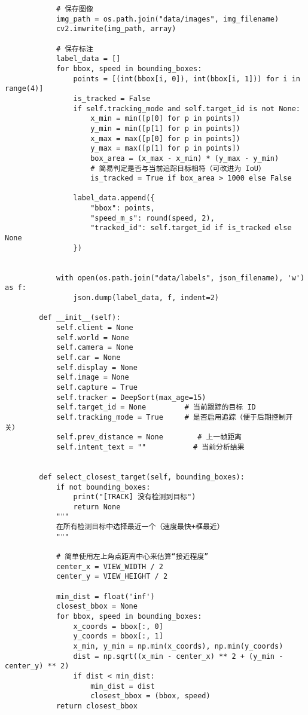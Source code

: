 \begin{lstlisting}
	        # 保存图像
	        img_path = os.path.join("data/images", img_filename)
	        cv2.imwrite(img_path, array)
	
	        # 保存标注
	        label_data = []
	        for bbox, speed in bounding_boxes:
	            points = [(int(bbox[i, 0]), int(bbox[i, 1])) for i in range(4)]
	            is_tracked = False
	            if self.tracking_mode and self.target_id is not None:
	                x_min = min([p[0] for p in points])
	                y_min = min([p[1] for p in points])
	                x_max = max([p[0] for p in points])
	                y_max = max([p[1] for p in points])
	                box_area = (x_max - x_min) * (y_max - y_min)
	                # 简易判定是否与当前追踪目标相符（可改进为 IoU）
	                is_tracked = True if box_area > 1000 else False
	
	            label_data.append({
	                "bbox": points,
	                "speed_m_s": round(speed, 2),
	                "tracked_id": self.target_id if is_tracked else None
	            })
	
	
	        with open(os.path.join("data/labels", json_filename), 'w') as f:
	            json.dump(label_data, f, indent=2)
	
	    def __init__(self):
	        self.client = None
	        self.world = None
	        self.camera = None
	        self.car = None
	        self.display = None
	        self.image = None
	        self.capture = True
	        self.tracker = DeepSort(max_age=15)
	        self.target_id = None         # 当前跟踪的目标 ID
	        self.tracking_mode = True     # 是否启用追踪（便于后期控制开关）
	        self.prev_distance = None        # 上一帧距离
	        self.intent_text = ""           # 当前分析结果
	
	
	    def select_closest_target(self, bounding_boxes):
	        if not bounding_boxes:
	            print("[TRACK] 没有检测到目标")
	            return None
	        """
	        在所有检测目标中选择最近一个（速度最快+框最近）
	        """
	
	        # 简单使用左上角点距离中心来估算“接近程度”
	        center_x = VIEW_WIDTH / 2
	        center_y = VIEW_HEIGHT / 2
	
	        min_dist = float('inf')
	        closest_bbox = None
	        for bbox, speed in bounding_boxes:
	            x_coords = bbox[:, 0]
	            y_coords = bbox[:, 1]
	            x_min, y_min = np.min(x_coords), np.min(y_coords)
	            dist = np.sqrt((x_min - center_x) ** 2 + (y_min - center_y) ** 2)
	            if dist < min_dist:
	                min_dist = dist
	                closest_bbox = (bbox, speed)
	        return closest_bbox
	

\end{lstlisting}
